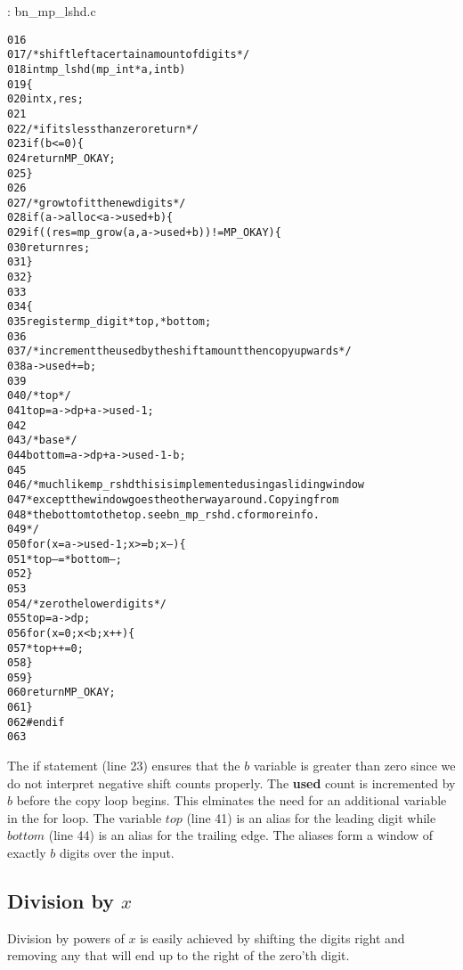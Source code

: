 \documentclass[b5paper]{book}
\begin{document}
\vspace{+3mm}\begin{small}
\hspace{-5.1mm}{\bf File}: bn\_mp\_lshd.c
\vspace{-3mm}
\begin{alltt}
016   
017   /* shift left a certain amount of digits */
018   int mp_lshd (mp_int * a, int b)
019   \{
020     int     x, res;
021   
022     /* if its less than zero return */
023     if (b <= 0) \{
024       return MP_OKAY;
025     \}
026   
027     /* grow to fit the new digits */
028     if (a->alloc < a->used + b) \{
029        if ((res = mp_grow (a, a->used + b)) != MP_OKAY) \{
030          return res;
031        \}
032     \}
033   
034     \{
035       register mp_digit *top, *bottom;
036   
037       /* increment the used by the shift amount then copy upwards */
038       a->used += b;
039   
040       /* top */
041       top = a->dp + a->used - 1;
042   
043       /* base */
044       bottom = a->dp + a->used - 1 - b;
045   
046       /* much like mp_rshd this is implemented using a sliding window
047        * except the window goes the otherway around.  Copying from
048        * the bottom to the top.  see bn_mp_rshd.c for more info.
049        */
050       for (x = a->used - 1; x >= b; x--) \{
051         *top-- = *bottom--;
052       \}
053   
054       /* zero the lower digits */
055       top = a->dp;
056       for (x = 0; x < b; x++) \{
057         *top++ = 0;
058       \}
059     \}
060     return MP_OKAY;
061   \}
062   #endif
063   
\end{alltt}
\end{small}

The if statement (line 23) ensures that the $b$ variable is greater than zero since we do not interpret negative
shift counts properly.  The \textbf{used} count is incremented by $b$ before the copy loop begins.  This elminates 
the need for an additional variable in the for loop.  The variable $top$ (line 41) is an alias
for the leading digit while $bottom$ (line 44) is an alias for the trailing edge.  The aliases form a 
window of exactly $b$ digits over the input.  

\subsection{Division by $x$}

Division by powers of $x$ is easily achieved by shifting the digits right and removing any that will end up to the right of the zero'th digit.  
\end{document}
